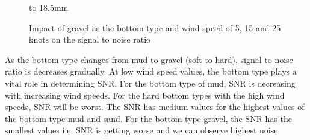 \newpage

\begin{figure}[h]
\centering
{}
\newline
\hbox to 18.5mm{}%
\caption{Impact of gravel as the bottom type and wind speed of 5, 15 and 25 knots on the signal to noise ratio}
\end{figure}

\noindent As the bottom type changes from mud to gravel (soft to hard), signal to noise ratio is decreases gradually. At low wind speed values, the bottom type plays a vital role in determining SNR. For the bottom type of mud, SNR is decreasing with increasing wind speeds. For the hard bottom types with the high wind speeds, SNR will be worst. The SNR has medium values for the highest values of the bottom type mud and sand. For the bottom type gravel, the SNR has the smallest values i.e. SNR is getting worse and we can observe highest noise.


